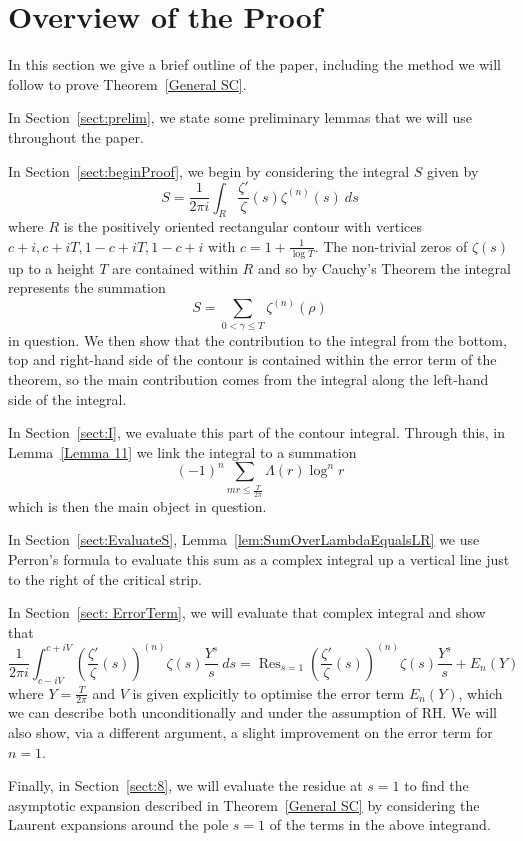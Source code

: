 \documentclass[12pt,a4paper,reqno]{amsart}
\DeclareMathOperator*{\Res}{Res}
\theoremstyle{remark}
\numberwithin{equation}{section}
\begin{document}
\section{Overview of the Proof}
In this section we give a brief outline of the paper, including the method we will follow to prove Theorem~\ref{General SC}.



In Section~\ref{sect:prelim}, we state some preliminary lemmas that we will use throughout the paper.

In Section~\ref{sect:beginProof}, we begin by considering the integral $S$ given by
\begin{equation*}
S= \frac{1}{2 \pi i} \int_R \frac{\zeta '}{\zeta}(s) \zeta ^{(n)} (s) \ ds
\end{equation*}
where $R$ is the positively oriented rectangular contour with vertices $c+i, c+iT, 1-c+iT, 1-c+i$ with $c=1 + \frac{1}{\log T}$. The non-trivial zeros of $\zeta (s)$ up to a height $T$ are contained within $R$ and so by Cauchy's Theorem the integral represents the summation
\[
S= \sum_{0 < \gamma \leq T} \zeta ^{(n)} (\rho)
\]
in question. We then show that the contribution to the integral from the bottom, top and right-hand side of the contour is contained within the error term of the theorem, so the main contribution comes from the integral along the left-hand side of the integral.

In Section~\ref{sect:I}, we evaluate this part of the contour integral. Through this, in Lemma~\ref{Lemma 11} we link the integral to a summation
\[
(-1)^n \sum_{m r \leq \frac{T}{2 \pi}} \Lambda(r) \log^n r
\]
which is then the main object in question.

In Section~\ref{sect:EvaluateS}, Lemma~\ref{lem:SumOverLambdaEqualsLR} we  use Perron's formula to evaluate this sum as a complex integral up a vertical line just to the right of the critical strip.

In Section~\ref{sect: ErrorTerm}, we will evaluate that complex integral and show that 
\[
\frac{1}{2 \pi i } \int_{c- iV}^{c + iV}\left( \frac{\zeta'}{\zeta}(s) \right)^{(n)} \zeta(s) \frac{Y^s}{s} \ ds = \Res_{s=1} \left( \frac{\zeta'}{\zeta}(s) \right)^{(n)} \zeta(s) \frac{Y^s}{s} + E_n(Y)
\]
where $Y=\frac{T}{2\pi}$ and $V$ is given explicitly to optimise the error term $E_n(Y)$, which we can describe both unconditionally and under the assumption of RH. We will also show, via a different argument, a slight improvement on the error term for $n=1$. 

Finally, in Section~\ref{sect:8}, we will evaluate the residue at $s=1$ to find the asymptotic expansion described in Theorem~\ref{General SC} by considering the Laurent expansions around the pole $s=1$ of the terms in the above integrand.
\end{document}

